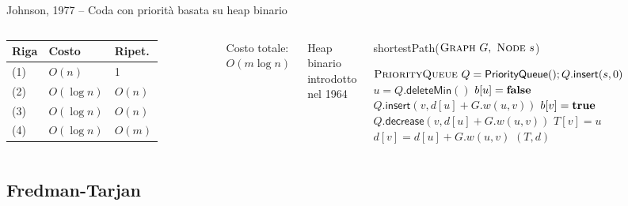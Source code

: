 \begin{frame}{Johnson, 1977 -- Coda con priorità basata su heap binario}


\vspace{-9pt}

\begin{columns}

\begingroup
\renewcommand*{\arraystretch}{1.2}
\begin{tabular}{|l|l|l|}
\hline
Riga & Costo & Ripet. \\\hline
(1) & $O(n)$ & 1 \\\hline
(2) & $O(\log n)$ & $O(n)$ \\\hline
(3) & $O(\log n)$ & $O(n)$ \\\hline
(4) & $O(\log n)$ & $O(m)$ \\\hline
\end{tabular}
\endgroup

\medskip
Costo totale: \alert{$O(m \log n)$}

\medskip
Heap binario introdotto nel 1964

\vspace{-12pt}
\tiny
\begin{Procedure}
\caption[A]{\textsf{shortestPath}($\textsc{Graph}\ G,\ \textsc{Node}\ s$)}
\alert{$\textsc{PriorityQueue}\ Q = \textsf{PriorityQueue}(); Q.\textsf{insert}(s, 0)$}\;
{
  \alert{$u = Q.\textsf{deleteMin}()$}\;
  $b[u] = \FALSE$\;
  {
    {
      {
        \alert{$Q.\textsf{insert}(v, d[u]+G.w(u,v))$}\;
        $b[v] = \TRUE$\;
      }
      {
        \alert{$Q.\textsf{decrease}(v, d[u]+G.w(u,v))$}
      }
      $T[v] = u$\;
      $d[v] = d[u] + G.w(u,v)$\;
    }
  }
}
\Return $(T,d)$
\end{Procedure}
\end{columns}



\end{frame}

\subsection{Fredman-Tarjan}


